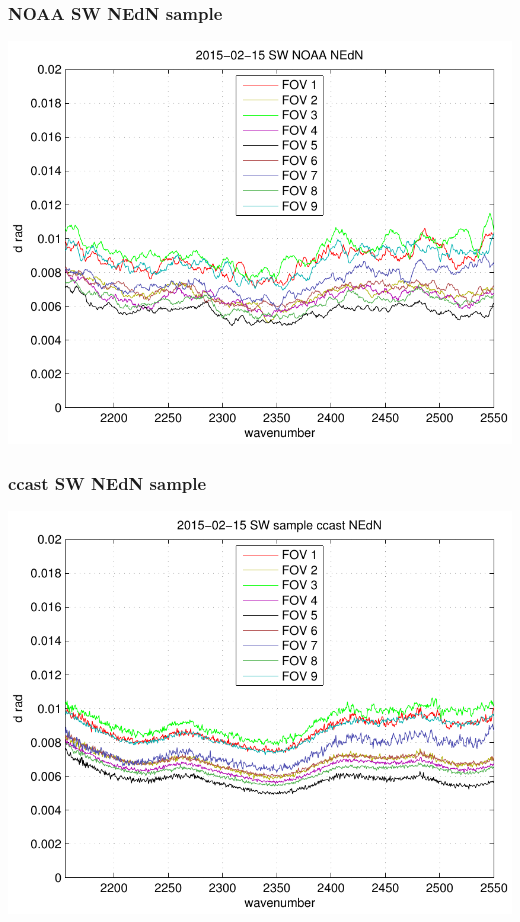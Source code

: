 \documentclass[11pt]{beamer}
\begin{document}
\begin{frame}
\frametitle{NOAA SW NEdN sample}

\begin{center}
  \includegraphics[scale=0.54]{figures/nedn_noaa_SW.pdf}
\end{center}

\end{frame}
\begin{frame}
\frametitle{ccast SW NEdN sample}

\begin{center}
  \includegraphics[scale=0.54]{figures/nedn_ccast_SW.pdf}
\end{center}

\end{frame}
\end{document}
